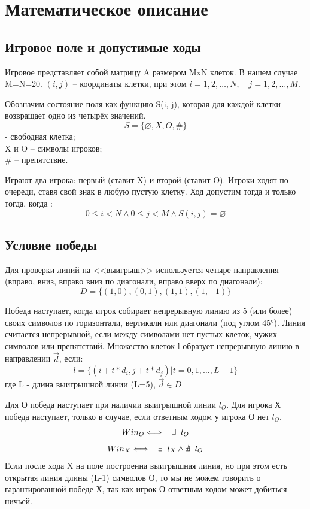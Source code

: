 \documentclass[14pt]{extreport}
\begin{document}
\newpage
{\centering\section{Математическое описание}}
{\centering\subsection{Игровое поле и допустимые ходы}}

Игровое представляет собой матрицу A размером MxN клеток. В нашем случае M=N=20. 
$(i, j)$ -- координаты клетки, при этом $ i=1,2,\ldots,N, \quad j=1,2,\ldots,M $. 

Обозначим состояние поля как функцию S(i, j), которая для каждой клетки возвращает одно из четырёх значений.
\[ S = \{  \varnothing, X, O, \# \} \]
\noindent {\Large$\varnothing$} - свободная клетка; \\
X и O -- символы игроков; \\
\# -- препятствие. 

Играют два игрока: первый (ставит X) и второй (ставит O). Игроки ходят по очереди, ставя свой знак в любую пустую клетку.
Ход допустим тогда и только тогда, когда : 
\[ 0 \leq i < N \land 0 \leq j < M \land S(i, j) = \varnothing \]

\subsection{Условие победы}
Для проверки линий на <<выигрыш>> используется четыре направления (вправо, вниз, вправо вниз по диагонали, вправо вверх по диагонали):
\[ D = \{(1,0), (0,1), (1,1), (1,-1)\} \]

Победа наступает, когда игрок собирает непрерывную линию из 5 (или более) своих символов по горизонтали, вертикали или диагонали (под углом 45°). 
Линия считается непрерывной, если между символами нет пустых клеток, чужих символов или препятствий.
Множество клеток l образует непрерывную линию в направлении $\vec{d}$, если:
\[ l = \{ (i+t*d_i, j+t*d_j) | t = 0, 1, \dots, L-1\} \]
где L - длина выигрышной линии (L=5), $\vec{d} \in D$

Для О победа наступает при наличии выигрышной линии $l_O$. Для игрока Х победа наступает, только в случае, если ответным ходом у игрока О нет $l_O$.
\[ Win_O \Longleftrightarrow \hspace{3mm} \exists \hspace{2mm} l_O \]
\[ Win_X \Longleftrightarrow \hspace{3mm} \exists \hspace{2mm} l_X \land \nexists \hspace{2mm} l_O \]
Если после хода Х на поле построенна выигрышная линия, но при этом есть открытая линия длины (L-1) символов О, то мы не можем говорить о гарантированной победе Х, так как игрок О ответным ходом может добиться ничьей.
\end{document}
